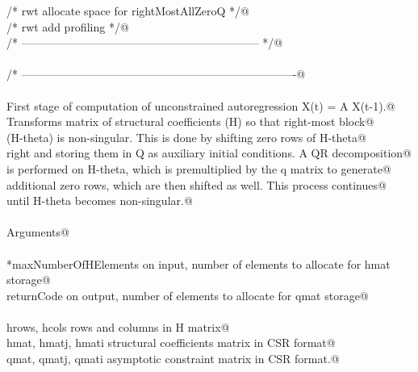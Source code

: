 \documentclass[12pt]{article}
\begin{document}
\begin{flushleft}
\begin{minipage}{\linewidth}
\begin{list}{}{}
\mbox{}\verb@/* rwt allocate space for rightMostAllZeroQ                        */@\\
\mbox{}\verb@/* rwt add profiling                                               */@\\
\mbox{}\verb@/* --------------------------------------------------------------- */@\\
\mbox{}\verb@@\\
\mbox{}\verb@/* -------------------------------------------------------------------------@\\
\mbox{}\verb@@\\
\mbox{}\verb@        First stage of computation of unconstrained autoregression X(t) = A X(t-1).@\\
\mbox{}\verb@        Transforms matrix of structural coefficients (H) so that right-most block@\\
\mbox{}\verb@        (H-theta) is non-singular.  This is done by shifting zero rows of H-theta@\\
\mbox{}\verb@        right and storing them in Q as auxiliary initial conditions.  A QR decomposition@\\
\mbox{}\verb@        is performed on H-theta, which is premultiplied by the q matrix to generate@\\
\mbox{}\verb@        additional zero rows, which are then shifted as well.  This process continues@\\
\mbox{}\verb@        until H-theta becomes non-singular.@\\
\mbox{}\verb@@\\
\mbox{}\verb@        Arguments@\\
\mbox{}\verb@@\\
\mbox{}\verb@                *maxNumberOfHElements                   on input, number of elements to allocate for hmat storage@\\
\mbox{}\verb@                returnCode                                              on output, number of elements to allocate for qmat storage@\\
\mbox{}\verb@@\\
\mbox{}\verb@                hrows, hcols                                    rows and columns in H matrix@\\
\mbox{}\verb@                hmat, hmatj, hmati                              structural coefficients matrix in CSR format@\\
\mbox{}\verb@                qmat, qmatj, qmati                              asymptotic constraint matrix in CSR format.@\\

\end{list}
\end{minipage}
\end{flushleft}
\end{document}
